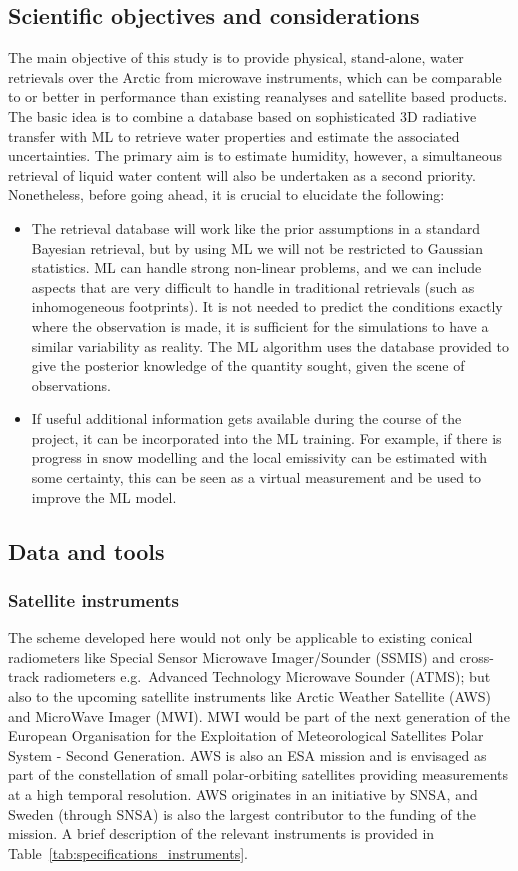 \documentclass[12pt,oneside,a4paper]{article}
\begin{document}
\subsection{Scientific objectives and considerations}
The main objective of this study is to provide physical, stand-alone, water
retrievals over the Arctic from microwave instruments, which can be comparable
to or better in performance than existing reanalyses and satellite based
products. The basic idea is to combine a database based on sophisticated 3D
radiative transfer with ML to retrieve water properties and estimate the
associated uncertainties. The primary aim is to estimate humidity, however, a
simultaneous retrieval of liquid water content will also be undertaken as a
second priority. Nonetheless, before going ahead, it is crucial to elucidate
the following:
\begin{itemize}
\item The retrieval database will work like the prior assumptions in a standard
  Bayesian retrieval, but by using ML we will not be restricted to Gaussian
  statistics. ML can handle strong non-linear problems, and we can include
  aspects that are very difficult to handle in traditional retrievals (such as
  inhomogeneous footprints). It is not needed to predict the conditions exactly
  where the observation is made, it is sufficient for the simulations to have a
  similar variability as reality. The ML algorithm uses the database provided
  to give the posterior knowledge of the quantity sought, given the scene of
  observations.
\item If useful additional information gets available during the course of the
  project, it can be incorporated into the ML training. For example, if there
  is progress in snow modelling and the local emissivity can be estimated with
  some certainty, this can be seen as a virtual measurement and be used to
  improve the ML model.
\end{itemize}

\subsection{Data and tools}
% 
\subsubsection{Satellite instruments}

The scheme developed here would not only be applicable to existing conical
radiometers like Special Sensor Microwave Imager/Sounder (SSMIS) and
cross-track radiometers e.g.\, Advanced Technology Microwave Sounder (ATMS);
but also to the upcoming satellite instruments like Arctic Weather Satellite
(AWS) and MicroWave Imager (MWI). MWI would be part of the next generation of
the European Organisation for the Exploitation of Meteorological Satellites
Polar System - Second Generation. AWS is also an ESA mission and is envisaged
as part of the constellation of small polar-orbiting satellites providing
measurements at a high temporal resolution. AWS originates in an initiative by
SNSA, and Sweden (through SNSA) is also the largest contributor to the funding
of the mission. A brief description of the relevant instruments is provided in
Table~\ref{tab:specifications_instruments}.
\end{document}
